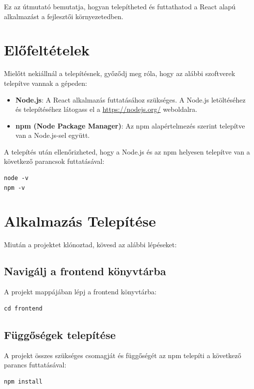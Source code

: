 \documentclass{report}[11pt]
\begin{document}
Ez az útmutató bemutatja, hogyan telepítheted és futtathatod a React alapú alkalmazást a fejlesztői környezetedben.

\section{Előfeltételek}

Mielőtt nekiállnál a telepítésnek, győződj meg róla, hogy az alábbi szoftverek telepítve vannak a gépeden:

\begin{itemize}
    \item \textbf{Node.js}: A React alkalmazás futtatásához szükséges. A Node.js letöltéséhez és telepítéséhez látogass el a \url{https://nodejs.org/} weboldalra.
    \item \textbf{npm (Node Package Manager)}: Az npm alapértelmezés szerint telepítve van a Node.js-sel együtt.
\end{itemize}

A telepítés után ellenőrizheted, hogy a Node.js és az npm helyesen telepítve van a következő parancsok futtatásával:

\begin{verbatim}
node -v
npm -v
\end{verbatim}

\section{Alkalmazás Telepítése}

Miután a projektet klónoztad, kövesd az alábbi lépéseket:

\subsection{Navigálj a frontend könyvtárba}

A projekt mappájában lépj a frontend könyvtárba:

\begin{verbatim}
cd frontend
\end{verbatim}

\subsection{Függőségek telepítése}

A projekt összes szükséges csomagját és függőségét az npm telepíti a következő parancs futtatásával:

\begin{verbatim}
npm install
\end{verbatim}
\end{document}
